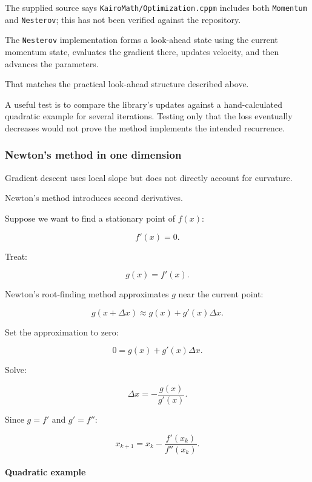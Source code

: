 \hypertarget{02-foundations-ii-ch026-repository-connection}{}

The supplied source says \texttt{KairoMath/Optimization.cppm} includes both \texttt{Momentum} and \texttt{Nesterov}; this has not been verified against the repository.

The \texttt{Nesterov} implementation forms a look-ahead state using the current momentum state, evaluates the gradient there, updates velocity, and then advances the parameters.

That matches the practical look-ahead structure described above.

A useful test is to compare the library's updates against a hand-calculated quadratic example for several iterations. Testing only that the loss eventually decreases would not prove the method implements the intended recurrence.

\subsubsection{Newton's method in one dimension}\label{02-foundations-ii-ch026-newtons-method-in-one-dimension}

\hypertarget{02-foundations-ii-ch026-newtons-method-in-one-dimension}{}

Gradient descent uses local slope but does not directly account for curvature.

Newton's method introduces second derivatives.

Suppose we want to find a stationary point of \(f(x)\):

\[
f'(x)=0.
\]

Treat:

\[
g(x)=f'(x).
\]

Newton's root-finding method approximates \(g\) near the current point:

\[
g(x+\Delta x) \approx g(x)+g'(x)\Delta x.
\]

Set the approximation to zero:

\[
0=g(x)+g'(x)\Delta x.
\]

Solve:

\[
\Delta x=-\frac{g(x)}{g'(x)}.
\]

Since \(g=f'\) and \(g'=f''\):

\[
\boxed{ x_{k+1} = x_k-\frac{f'(x_k)}{f''(x_k)} }.
\]

\paragraph{Quadratic example}\label{02-foundations-ii-ch026-quadratic-example}

